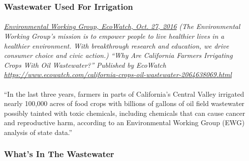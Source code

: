 \documentclass{article}
\begin{document}
\subsubsection{Wastewater Used For Irrigation}
\paragraph{}
\small
\textit{
\underline{Environmental Working Group, EcoWatch, Oct. 27, 2016}
(The Environmental Working Group’s mission is to empower people to live healthier lives in a healthier environment. With breakthrough research and education, we drive consumer choice and civic action.) “Why Are California Farmers Irrigating Crops With Oil Wastewater?” Published by EcoWatch \url{https://www.ecowatch.com/california-crops-oil-wastewater-2064638069.html}}
\normalsize
\paragraph{}
``In the last three years, farmers in parts of California's Central Valley irrigated nearly 100,000 acres of food crops with billions of gallons of oil field wastewater possibly tainted with toxic chemicals, including chemicals that can cause cancer and reproductive harm, according to an Environmental Working Group (EWG) analysis of state data.”

\subsubsection{What's In The Wastewater}
\end{document}
